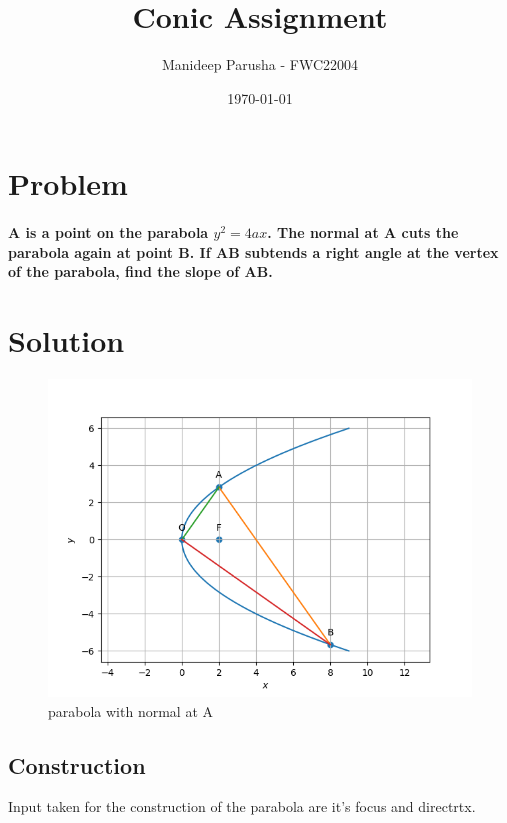\documentclass[journal,12pt,twocolumn]{article}
\title{\textbf{Conic Assignment}}
\author{Manideep Parusha - FWC22004}
\date{\today}
\let\vec\mathbf
\let\vec\mathbf
\begin{document}
\maketitle
\section*{Problem}
\paragraph{A is a point on the parabola $y^2 = 4ax$. The normal at $\vec{A}$ cuts the parabola again at point $\vec{B}$. If $\vec{AB}$ subtends a right angle at the vertex of the parabola, find the slope of AB.}

\section*{Solution}

\begin{figure}[h!]
\centering
\includegraphics[width=\columnwidth]{figs/plot_con.png}
	\caption{parabola with normal at A}
\label{fig:con_py}
\end{figure}

\subsection*{Construction}
Input taken for the construction of the parabola are it's focus and directrtx.
\end{document}
